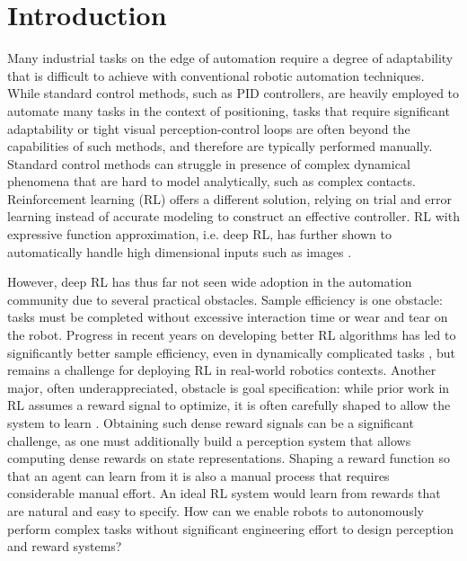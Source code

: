 \section{Introduction}\label{sec:introduction}

Many industrial tasks on the edge of automation require a degree of adaptability that is difficult to achieve with conventional robotic automation techniques.
While standard control methods, such as PID controllers, are heavily employed to automate many tasks in the context of positioning, tasks that require significant adaptability or tight visual perception-control loops are often beyond the capabilities of such methods, and therefore are typically performed manually.
Standard control methods can struggle in presence of complex dynamical phenomena that are hard to model analytically, such as complex contacts.
Reinforcement learning (RL) offers a different solution, relying on trial and error learning instead of accurate modeling to construct an effective controller.
RL with expressive function approximation, i.e. deep RL, has further shown to automatically handle high dimensional inputs such as images \citep{mnih2013atari}.

However, deep RL has thus far not seen wide adoption in the automation community due to several practical obstacles. 
Sample efficiency is one obstacle: tasks must be completed without excessive interaction time or wear and tear on the robot. Progress in recent years on developing better RL algorithms has led to significantly better sample efficiency, even in dynamically complicated tasks \citep{haarnoja2018sac, hessel2018rainbow},
but remains a challenge for deploying RL in real-world robotics contexts.
Another major, often underappreciated, obstacle is goal specification: while prior work in RL assumes a reward signal to optimize,
it is often carefully shaped to allow the system to learn \citep{ng1999rewardshaping, popov17stacking, daniel2014activereward}. 
Obtaining such dense reward signals can be a significant challenge, as one must additionally build a perception system that allows computing dense rewards on state representations. Shaping a reward function so that an agent can learn from it is also a manual process that requires considerable manual effort. An ideal RL system would learn from rewards that are natural and easy to specify.
How can we enable robots to autonomously perform complex tasks without significant engineering effort to design perception and reward systems?

